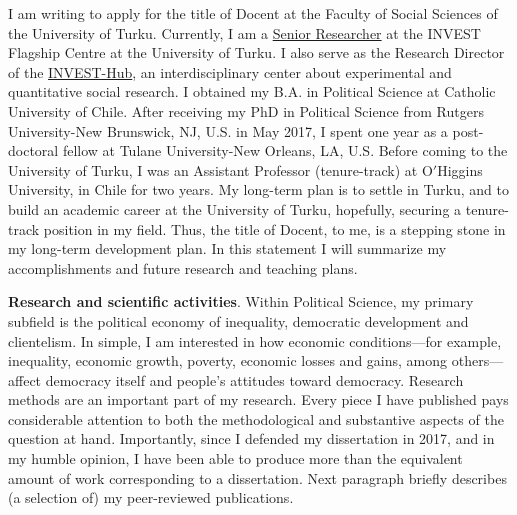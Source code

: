 \documentclass[10pt,stdletter,dateno,sigleft]{newlfm} %
\begin{document}
\begin{newlfm}

\vspace{-0.3cm}I am writing to apply for the title of Docent at the Faculty of Social Sciences of the University of Turku. Currently, I am a \href{https://www.utu.fi/en/people/hector-bahamonde-norambuena}{Senior Researcher} at the INVEST Flagship Centre at the University of Turku. I also serve as the Research Director of the \href{https://www.utu.fi/en/investhub}{INVEST-Hub}, an interdisciplinary center about experimental and quantitative social research. I obtained my B.A. in Political Science at Catholic University of Chile. After receiving my PhD in Political Science from Rutgers University-New Brunswick, NJ, U.S. in May 2017, I spent one year as a post-doctoral fellow at Tulane University-New Orleans, LA, U.S. Before coming to the University of Turku, I was an Assistant Professor (tenure-track) at O$'$Higgins University, in Chile for two years. My long-term plan is to settle in Turku, and to build an academic career at the University of Turku, hopefully, securing a tenure-track position in my field. Thus, the title of Docent, to me, is a stepping stone in my long-term development plan. In this statement I will summarize my accomplishments and future research and teaching plans.

{\bf Research and scientific activities}. Within Political Science, my primary subfield is the political economy of inequality, democratic development and clientelism. In simple, I am interested in how economic conditions---for example, inequality, economic growth, poverty, economic losses and gains, among others---affect democracy itself and people's attitudes toward democracy. Research methods are an important part of my research. Every piece I have published pays considerable attention to both the methodological and substantive aspects of the question at hand. Importantly, since I defended my dissertation in 2017, and in my humble opinion, I have been able to produce more than the equivalent amount of work corresponding to a dissertation. Next paragraph briefly describes (a selection of) my peer-reviewed publications.



\end{newlfm}
\end{document}
